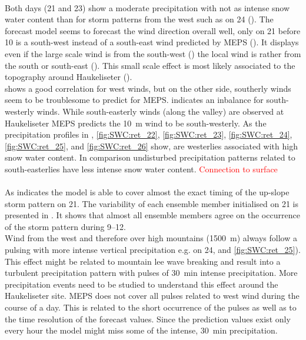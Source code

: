 \\
Both days (\num{21} and \SI{23}{\dec}) show a moderate precipitation with not as intense snow water content than for storm patterns from the west such as on \SI{24}{\dec} (). 
The forecast model seems to forecast the wind direction overall well, only on \SI{21}{\dec} before \SI{10}{\UTC} is a south-west instead of a south-east wind predicted by MEPS (). It displays even if the large scale wind is from the south-west () the local wind is rather from the south or south-east (). This small scale effect is most likely associated to the topography around Haukeliseter ().
\\
 shows a good correlation for west winds, but on the other side, southerly winds seem to be troublesome to predict for MEPS.  indicates an inbalance for south-westerly winds. While south-easterly winds (along the valley) are observed at Haukeliseter MEPS predicts the \SI{10}{\metre} wind to be south-westerly. As the precipitation profiles in , \ref{fig:SWC:ret_22}, \ref{fig:SWC:ret_23}, \ref{fig:SWC:ret_24}, \ref{fig:SWC:ret_25}, and \ref{fig:SWC:ret_26} show, are westerlies associated with high snow water content. In comparison undisturbed precipitation patterns related to south-easterlies have less intense snow water content. \textcolor{red}{Connection to surface }
\\
\\
As  indicates the model is able to cover almost the exact timing of the up-slope storm pattern on \SI{21}{\dec}. The variability of each ensemble member initialised on \SI{21}{\dec} is presented in . It shows that almost all ensemble members agree on the occurrence of the storm pattern during \SIrange{9}{12}{\UTC}.
\\
Wind from the west and therefore over high mountains (\SI{1500}{\metre}) always follow a pulsing with more intense vertical precipitation e.g. on \SI{24}{\dec},  and \ref{fig:SWC:ret_25}). 
This effect might be related to mountain lee wave breaking %
and result into a turbulent precipitation pattern with pulses of \SI{30}{\minute} intense precipitation. More precipitation events need to be studied to understand this effect around the Haukeliseter site. MEPS does not cover all pulses related to west wind during the course of a day. This is related to the short occurrence of the pulses as well as to the time resolution of the forecast values. Since the prediction values exist only every hour the model might miss some of the intense, \SI{30}{\minute} precipitation. %
